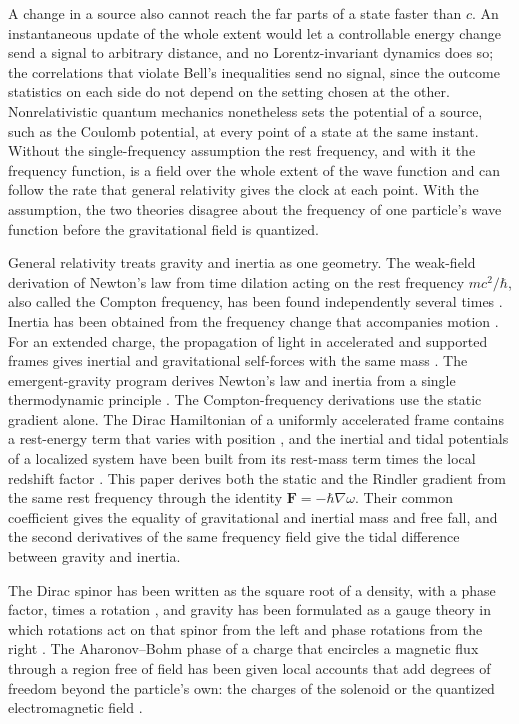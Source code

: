 \documentclass[aps,prd,onecolumn,tightenlines,nofootinbib,notitlepage,11pt,floatfix]{revtex4-2}
\theoremstyle{indentedtheorem}
\begin{document}
A change in a source also cannot reach the far parts of a state faster than $c$. An instantaneous update of the whole extent would let a controllable energy change send a signal to arbitrary distance, and no Lorentz-invariant dynamics does so; the correlations that violate Bell's inequalities \citep{Bell1964EPR,Aspect1982Experimental} send no signal, since the outcome statistics on each side do not depend on the setting chosen at the other. Nonrelativistic quantum mechanics nonetheless sets the potential of a source, such as the Coulomb potential, at every point of a state at the same instant. Without the single-frequency assumption the rest frequency, and with it the frequency function, is a field over the whole extent of the wave function and can follow the rate that general relativity gives the clock at each point. With the assumption, the two theories disagree about the frequency of one particle's wave function before the gravitational field is quantized.

General relativity treats gravity and inertia as one geometry. The weak-field derivation of Newton's law from time dilation acting on the rest frequency $mc^2/\hbar$, also called the Compton frequency, has been found independently several times \citep{Evans2001Matter,Wootters2003Why,Mueller2014Quantum,Xu2019DeBroglie,Czarnecki2021Gravitational}. Inertia has been obtained from the frequency change that accompanies motion \citep{Schlegel1954Wave}. For an extended charge, the propagation of light in accelerated and supported frames gives inertial and gravitational self-forces with the same mass \citep{Petkov1999Acceleration}. The emergent-gravity program derives Newton's law and inertia from a single thermodynamic principle \citep{Verlinde2011Origin}. The Compton-frequency derivations use the static gradient alone. The Dirac Hamiltonian of a uniformly accelerated frame contains a rest-energy term that varies with position \citep{HehlNi1990Inertial}, and the inertial and tidal potentials of a localized system have been built from its rest-mass term times the local redshift factor \citep{Perche2022Localized}. This paper derives both the static and the Rindler gradient from the same rest frequency through the identity $\mathbf{F}=-\hbar\nabla\omega$. Their common coefficient gives the equality of gravitational and inertial mass and free fall, and the second derivatives of the same frequency field give the tidal difference between gravity and inertia.

The Dirac spinor has been written as the square root of a density, with a phase factor, times a rotation \citep{Hestenes1967Real,Hestenes1990Zitterbewegung}, and gravity has been formulated as a gauge theory in which rotations act on that spinor from the left and phase rotations from the right \citep{LasenbyDoranGull1998Gravity}. The Aharonov--Bohm phase of a charge that encircles a magnetic flux through a region free of field \citep{Aharonov1959Significance} has been given local accounts that add degrees of freedom beyond the particle's own: the charges of the solenoid \citep{Vaidman2012Role} or the quantized electromagnetic field \citep{Marletto2020Aharonov}.
\end{document}
